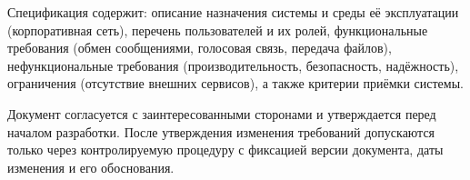 \documentclass[14pt,a4paper]{extarticle}
\begin{document}
Спецификация содержит: описание назначения системы и среды её эксплуатации (корпоративная сеть), перечень пользователей и их ролей, функциональные требования (обмен сообщениями, голосовая связь, передача файлов), нефункциональные требования (производительность, безопасность, надёжность), ограничения (отсутствие внешних сервисов), а также критерии приёмки системы.

Документ согласуется с заинтересованными сторонами и утверждается перед началом разработки. После утверждения изменения требований допускаются только через контролируемую процедуру с фиксацией версии документа, даты изменения и его обоснования.
\end{document}
